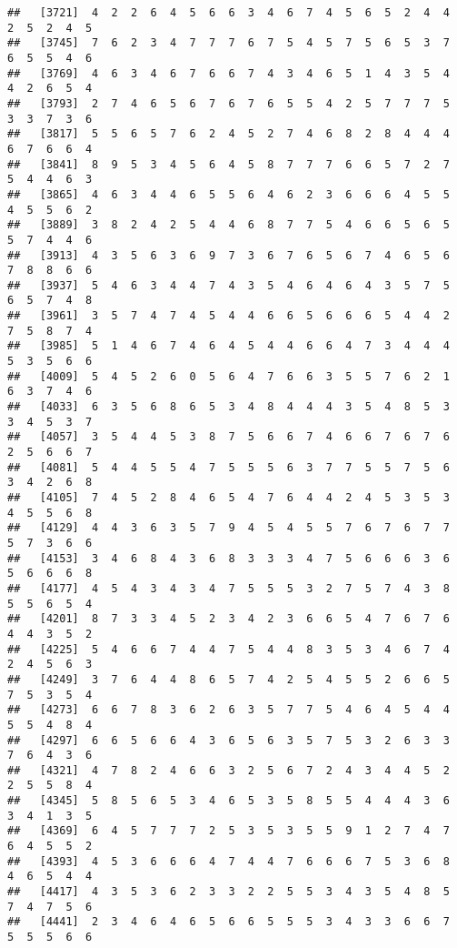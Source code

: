 \documentclass[
]{book}
\begin{document}
\begin{verbatim}
##   [3721]  4  2  2  6  4  5  6  6  3  4  6  7  4  5  6  5  2  4  4  2  5  2  4  5
##   [3745]  7  6  2  3  4  7  7  7  6  7  5  4  5  7  5  6  5  3  7  6  5  5  4  6
##   [3769]  4  6  3  4  6  7  6  6  7  4  3  4  6  5  1  4  3  5  4  4  2  6  5  4
##   [3793]  2  7  4  6  5  6  7  6  7  6  5  5  4  2  5  7  7  7  5  3  3  7  3  6
##   [3817]  5  5  6  5  7  6  2  4  5  2  7  4  6  8  2  8  4  4  4  6  7  6  6  4
##   [3841]  8  9  5  3  4  5  6  4  5  8  7  7  7  6  6  5  7  2  7  5  4  4  6  3
##   [3865]  4  6  3  4  4  6  5  5  6  4  6  2  3  6  6  6  4  5  5  4  5  5  6  2
##   [3889]  3  8  2  4  2  5  4  4  6  8  7  7  5  4  6  6  5  6  5  5  7  4  4  6
##   [3913]  4  3  5  6  3  6  9  7  3  6  7  6  5  6  7  4  6  5  6  7  8  8  6  6
##   [3937]  5  4  6  3  4  4  7  4  3  5  4  6  4  6  4  3  5  7  5  6  5  7  4  8
##   [3961]  3  5  7  4  7  4  5  4  4  6  6  5  6  6  6  5  4  4  2  7  5  8  7  4
##   [3985]  5  1  4  6  7  4  6  4  5  4  4  6  6  4  7  3  4  4  4  5  3  5  6  6
##   [4009]  5  4  5  2  6  0  5  6  4  7  6  6  3  5  5  7  6  2  1  6  3  7  4  6
##   [4033]  6  3  5  6  8  6  5  3  4  8  4  4  4  3  5  4  8  5  3  3  4  5  3  7
##   [4057]  3  5  4  4  5  3  8  7  5  6  6  7  4  6  6  7  6  7  6  2  5  6  6  7
##   [4081]  5  4  4  5  5  4  7  5  5  5  6  3  7  7  5  5  7  5  6  3  4  2  6  8
##   [4105]  7  4  5  2  8  4  6  5  4  7  6  4  4  2  4  5  3  5  3  4  5  5  6  8
##   [4129]  4  4  3  6  3  5  7  9  4  5  4  5  5  7  6  7  6  7  7  5  7  3  6  6
##   [4153]  3  4  6  8  4  3  6  8  3  3  3  4  7  5  6  6  6  3  6  5  6  6  6  8
##   [4177]  4  5  4  3  4  3  4  7  5  5  5  3  2  7  5  7  4  3  8  5  5  6  5  4
##   [4201]  8  7  3  3  4  5  2  3  4  2  3  6  6  5  4  7  6  7  6  4  4  3  5  2
##   [4225]  5  4  6  6  7  4  4  7  5  4  4  8  3  5  3  4  6  7  4  2  4  5  6  3
##   [4249]  3  7  6  4  4  8  6  5  7  4  2  5  4  5  5  2  6  6  5  7  5  3  5  4
##   [4273]  6  6  7  8  3  6  2  6  3  5  7  7  5  4  6  4  5  4  4  5  5  4  8  4
##   [4297]  6  6  5  6  6  4  3  6  5  6  3  5  7  5  3  2  6  3  3  7  6  4  3  6
##   [4321]  4  7  8  2  4  6  6  3  2  5  6  7  2  4  3  4  4  5  2  2  5  5  8  4
##   [4345]  5  8  5  6  5  3  4  6  5  3  5  8  5  5  4  4  4  3  6  3  4  1  3  5
##   [4369]  6  4  5  7  7  7  2  5  3  5  3  5  5  9  1  2  7  4  7  6  4  5  5  2
##   [4393]  4  5  3  6  6  6  4  7  4  4  7  6  6  6  7  5  3  6  8  4  6  5  4  4
##   [4417]  4  3  5  3  6  2  3  3  2  2  5  5  3  4  3  5  4  8  5  7  4  7  5  6
##   [4441]  2  3  4  6  4  6  5  6  6  5  5  5  3  4  3  3  6  6  7  5  5  5  6  6

\end{verbatim}
\end{document}
